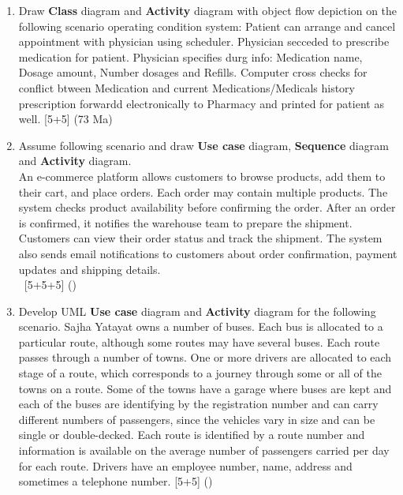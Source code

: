 \documentclass[12pt]{article}
\newcommand{\enter}{\\\textcolor{white}{1}}
\begin{document}
\begin{enumerate}
        \item Draw \textbf{Class} diagram and \textbf{Activity} diagram with object flow depiction on the following scenario operating condition system:
        Patient can arrange and cancel appointment with physician using scheduler. Physician secceded to prescribe medication for patient. Physician specifies durg info: Medication name, Dosage amount, Number dosages and Refills. Computer cross checks for conflict btween Medication and current Medications/Medicals history prescription forwardd electronically to Pharmacy and printed for patient as well. \hfill [5+5] (73 Ma)

      \item Assume following scenario and draw \textbf{Use case} diagram, \textbf{Sequence} diagram and \textbf{Activity} diagram.\\
        An e-commerce platform allows customers to browse products, add them to their cart, and place orders. Each order may contain multiple products. The system checks product availability before confirming the order. After an order is confirmed, it notifies the warehouse team to prepare the shipment. Customers can view their order status and track the shipment. The system also sends email notifications to customers about order confirmation, payment updates and shipping details.
        \enter\hfill [5+5+5] ()

      \item Develop UML \textbf{Use case} diagram and \textbf{Activity} diagram for the following scenario.
        Sajha Yatayat owns a number of buses. Each bus is allocated to a particular route, although some routes may have several buses. Each route passes through a number of towns. One or more drivers are allocated to each stage of a route, which corresponds to a journey through some or all of the towns on a route. Some of the towns have a garage where buses are kept and each of the buses are identifying by the registration number and can carry different numbers of passengers, since the vehicles vary in size and can be single or double-decked. Each route is identified by a route number and information is available on the average number of passengers carried per day for each route. Drivers have an employee number, name, address and sometimes a telephone number. \hfill [5+5] ()


\end{enumerate}
\end{document}
